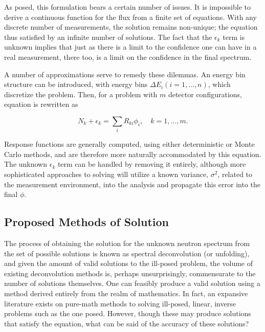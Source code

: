As posed, this formulation bears a certain number of issues.
It is impossible to derive a continuous function for the flux from a finite set of equations.
With any discrete number of measurements, the solution remains non-unique; the equation thus satisfied by an infinite number of solutions.
The fact that the $\epsilon_k$ term is unknown implies that just as there is a limit to the confidence one can have in a real measurement, there too, is a limit on the confidence in the final spectrum.

A number of approximations serve to remedy these dilemmas.
An energy bin structure can be introduced, with energy bins $\Delta E_i (i = 1, \ldots, n)$, which discretize the problem.
Then, for a problem with $m$ detector configurations, equation  is rewritten as

\begin{equation}
\label{eqn:disc-response}
N_k + \epsilon_k = \sum_i R_{ki} \phi_i, \quad k = 1,\ldots, m .
\end{equation}

Response functions are generally computed, using either deterministic or Monte Carlo methods, and are therefore more naturally accommodated by this equation.
The unknown $\epsilon_k$ term can be handled by removing it entirely, although more sophisticated approaches to solving will utilize a known variance, $\sigma^2$, related to the measurement environment, into the analysis and propagate this error into the final $\phi$.


\subsection{Proposed Methods of Solution}

The process of obtaining the solution for the unknown neutron spectrum from the set of possible solutions is known as spectral deconvolution (or unfolding), and given the amount of valid solutions to the ill-posed problem, the volume of existing deconvolution methods is, perhaps unsurprisingly, commensurate to the number of solutions themselves.
One can feasibly produce a valid solution using a method derived entirely from the realm of mathematics.
In fact, an expansive literature exists on pure-math methods to solving ill-posed, linear, inverse problems such as the one posed.
However, though these may produce solutions that satisfy the equation, what can be said of the accuracy of these solutions?

